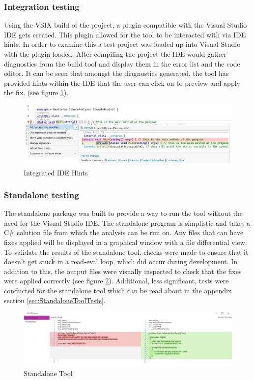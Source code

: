 \subsubsection{Integration testing}
Using the VSIX build of the project, a plugin compatible with the Visual Studio IDE gets created. This plugin allowed for the tool to be interacted with via IDE hints. In order to examine this a test project was loaded up into Visual Studio with the plugin loaded. After compiling the project the IDE would gather diagnostics from the build tool and display them in the error list and the code editor. It can be seen that amongst the diagnostics generated, the tool has provided hints within the IDE that the user can click on to preview and apply the fix. (see figure \ref{fig:IDEHints}).

\begin{figure}[H]
    \vspace{-10px}
    \centering
    \caption{Integrated IDE Hints}
    \label{fig:IDEHints}
    \includegraphics[width=\textwidth]{Figures/IDEHintsCropped.png}
\end{figure}

\subsubsection{Standalone testing}
The standalone package was built to provide a way to run the tool without the need for the Visual Studio IDE. The standalone program is simplistic and takes a C\# solution file from which the analysis can be run on. Any files that can have fixes applied will be displayed in a graphical window with a file differential view. To validate the results of the standalone tool, checks were made to ensure that it doesn't get stuck in a read-eval loop, which did occur during development. In addition to this, the output files were visually inspected to check that the fixes were applied correctly (see figure \ref{fig:StandaloneTool}). Additional, less significant, tests were conducted for the standalone tool which can be read about in the appendix section \ref{sec:StandaloneToolTests}.

\begin{figure}[H]
    \centering
    \caption{Standalone Tool}
    \label{fig:StandaloneTool}
    \includegraphics[width=\textwidth]{Figures/StandaloneToolCropped.png}
\end{figure}
